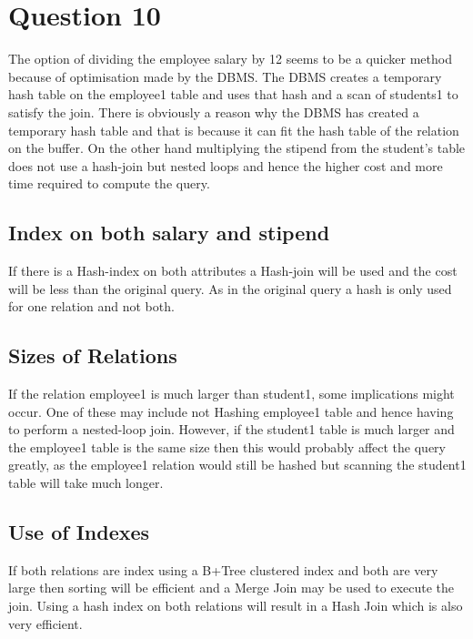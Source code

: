 \section*{Question 10}
The option of dividing the employee salary by 12 seems to be a quicker method because of optimisation made by the DBMS. The DBMS creates a temporary hash table on the employee1 table and uses that hash and a scan of students1 to satisfy the join. There is obviously a reason why the DBMS has created a temporary hash table and that is because it can fit the hash table of the relation on the buffer. 
On the other hand multiplying the stipend from the student's table does not use a hash-join but nested loops and hence the higher cost and more time required to compute the query.

\subsection*{Index on both salary and stipend}
If there is a Hash-index on both attributes a Hash-join will be used and the cost will be less than the original query. As in the original query a hash is only used for one relation and not both.

\subsection*{Sizes of Relations}
If the relation employee1 is much larger than student1, some implications might occur. One of these may include not Hashing employee1 table and hence having to perform a nested-loop join. However, if the student1 table is much larger and the employee1 table is the same size then this would probably affect the query greatly, as the employee1 relation would still be hashed but scanning the student1 table will take much longer.

\subsection*{Use of Indexes}
If both relations are index using a B+Tree clustered index and both are very large then sorting will be efficient and a Merge Join may be used to execute the join. Using a hash index on both relations will result in a Hash Join which is also very efficient.

